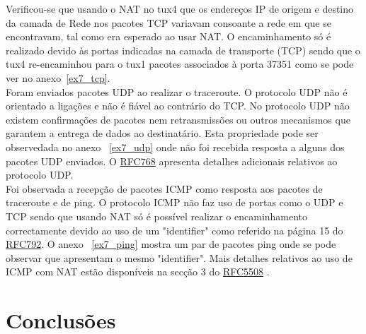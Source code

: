 \documentclass[11pt,a4paper,reqno]{report}
\numberwithin{equation}{section}
\begin{document}
Verificou-se que usando o NAT no tux4 que os endereços IP de origem e destino da camada de Rede nos pacotes TCP variavam consoante a rede em que se encontravam, tal como era esperado ao usar NAT. O encaminhamento só é realizado devido às portas indicadas na camada de transporte (TCP) sendo que o tux4 re-encaminhou para o tux1 pacotes associados à porta 37351 como se pode ver no anexo~\ref{ex7_tcp}.\\

Foram enviados pacotes UDP ao realizar o traceroute. O protocolo UDP não é orientado a ligações e não é fiável ao contrário do TCP. No protocolo UDP não existem confirmações de pacotes nem retransmissões ou outros mecanismos que garantem a entrega de dados ao destinatário. Esta propriedade pode ser observedada no anexo ~\ref{ex7_udp} onde não foi recebida resposta a alguns dos pacotes UDP enviados. O \href{https://www.ietf.org/rfc/rfc768.txt}{RFC768} apresenta detalhes adicionais relativos ao protocolo UDP.\\

Foi observada a recepção de pacotes ICMP como resposta aos pacotes de traceroute e de ping. O protocolo ICMP não faz uso de portas como o UDP e TCP sendo que usando NAT só é possível realizar o encaminhamento correctamente devido ao uso de um "identifier" como referido na página 15 do \href{https://www.ietf.org/rfc/rfc792.txt}{RFC792}. O anexo ~\ref{ex7_ping} mostra um par de pacotes ping onde se pode observar que apresentam o mesmo "identifier". Mais detalhes relativos ao uso de ICMP com NAT estão disponíveis na secção 3 do \href{https://www.ietf.org/rfc/rfc5508.txt}{RFC5508} . 

\chapter{Conclusões}


\end{document}
